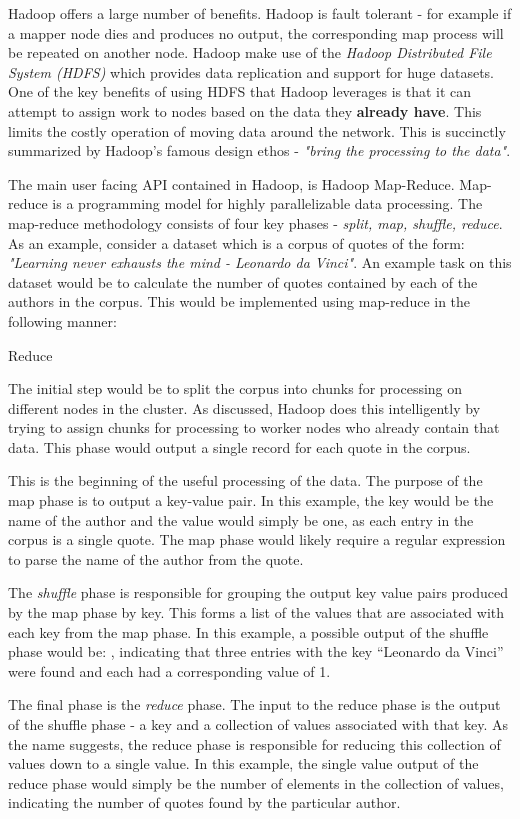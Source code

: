 Hadoop offers a large number of benefits. Hadoop is fault tolerant - for example if a mapper node dies and produces no output, the corresponding map process will be repeated on another node. Hadoop make use of the \textit{Hadoop Distributed File System (HDFS)} \cite{HDFS} which provides data replication and support for huge datasets. One of the key benefits of using HDFS that Hadoop leverages is that it can attempt to assign work to nodes based on the data they \textbf{already have}. This limits the costly operation of moving data around the network. This is succinctly summarized by Hadoop's famous design ethos - \textit{"bring the processing to the data"}.

The main user facing API contained in Hadoop, is Hadoop Map-Reduce. Map-reduce is a programming model for highly parallelizable data processing. The map-reduce methodology consists of four key phases - \textit{split, map, shuffle, reduce}. As an example, consider a dataset which is a corpus of quotes of the form:
\textit{"Learning never exhausts the mind - Leonardo da Vinci"}. An example task on this dataset would be to calculate the number of quotes contained by each of the authors in the corpus. This would be implemented using map-reduce in the following manner:

\begin{labeling}{Reduce }
	\item [Split] The initial step would be to split the corpus into chunks for processing on different nodes in the cluster. As discussed, Hadoop does this intelligently by trying to assign chunks for processing to worker nodes who already contain that data. This phase would output a single record for each quote in the corpus.
  \item [Map] This is the beginning of the useful processing of the data. The purpose of the map phase is to output a key-value pair. In this example, the key would be the name of the author and the value would simply be one, as each entry in the corpus is a single quote. The map phase would likely require a regular expression to parse the name of the author from the quote.
  \item [Shuffle] The \textit{shuffle} phase is responsible for grouping the output key value pairs produced by the map phase by key. This forms a list of the values that are associated with each key from the map phase. In this example, a possible output of the shuffle phase would be: , indicating that three entries with the key ``Leonardo da Vinci'' were found and each had a corresponding value of 1. 
  \item [Reduce] The final phase is the \textit{reduce} phase. The input to the reduce phase is the output of the shuffle phase - a key and a collection of values associated with that key. As the name suggests, the reduce phase is responsible for reducing this collection of values down to a single value. In this example, the single value output of the reduce phase would simply be the number of elements in the collection of values, indicating the number of quotes found by the particular author.
\end{labeling}


